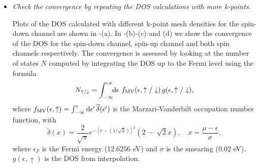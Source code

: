 \begin{itemize}
	\item {\it Check the convergence by repeating the DOS calculations with more k-points.}

	Plots of the DOS calculated with different k-point mesh densities for the spin-down channel are shown in -(a). In -(b)-(c) and (d) we show the convergence of the DOS for the spin-down channel, spin-up channel and both spin channels respectively. The convergence is assessed by looking at the number of states $N$ computed by integrating the DOS up to the Fermi level using the formula
	\begin{equation}
	N_{\uparrow/\downarrow} = \int_{-\infty}^{\epsilon_F}\!\! \mathrm{d}\epsilon\,\, f\tinysub{MV}(\epsilon,\uparrow/\downarrow)\, g(\epsilon,\uparrow/\downarrow), 
	\end{equation}
	where $f\tinysub{MV}(\epsilon,\uparrow) = \int_{-\infty}^{\epsilon} \mathrm{d}\epsilon'\,\widetilde{\delta}(\epsilon')$ is the Marzari-Vanderbilt occupation number function, with $$\widetilde{\delta}(x) = \frac{2}{\sqrt{\pi}}e^{-[x-(1/\sqrt{2})]^2}(2\,-\,\sqrt{2}x), \quad x=\frac{\mu-\epsilon}{\sigma},$$
	where $\epsilon_F$ is the Fermi energy ($12.6256$ eV) and $\sigma$ is the smearing ($0.02$ eV). $g(\epsilon,\uparrow)$ is the DOS from \Wannier{} interpolation. 



\end{itemize}
